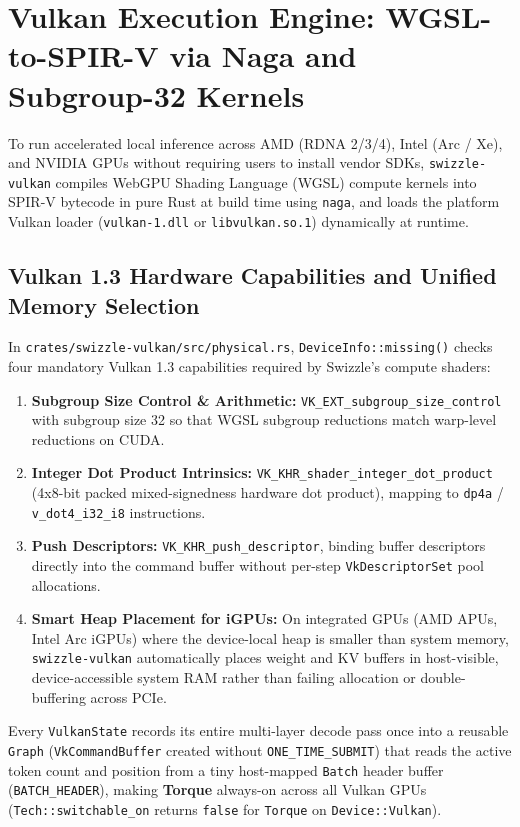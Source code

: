 \documentclass[10pt,a4paper]{article}
\theoremstyle{swzstyle}
\newcommand{\code}[1]{\texttt{#1}}
\begin{document}
\section{Vulkan Execution Engine: WGSL-to-SPIR-V via Naga and Subgroup-32 Kernels}

To run accelerated local inference across AMD (RDNA 2/3/4), Intel (Arc / Xe), and NVIDIA GPUs without requiring users to install vendor SDKs, \code{swizzle-vulkan} compiles WebGPU Shading Language (WGSL) compute kernels into SPIR-V bytecode in pure Rust at build time using \code{naga}, and loads the platform Vulkan loader (\code{vulkan-1.dll} or \code{libvulkan.so.1}) dynamically at runtime.

\subsection{Vulkan 1.3 Hardware Capabilities and Unified Memory Selection}

In \code{crates/swizzle-vulkan/src/physical.rs}, \code{DeviceInfo::missing()} checks four mandatory Vulkan 1.3 capabilities required by Swizzle's compute shaders:
\begin{enumerate}
  \item \textbf{Subgroup Size Control \& Arithmetic:} \code{VK\_EXT\_subgroup\_size\_control} with subgroup size 32 so that WGSL subgroup reductions match warp-level reductions on CUDA.
  \item \textbf{Integer Dot Product Intrinsics:} \code{VK\_KHR\_shader\_integer\_dot\_product} (4x8-bit packed mixed-signedness hardware dot product), mapping to \code{dp4a} / \code{v\_dot4\_i32\_i8} instructions.
  \item \textbf{Push Descriptors:} \code{VK\_KHR\_push\_descriptor}, binding buffer descriptors directly into the command buffer without per-step \code{VkDescriptorSet} pool allocations.
  \item \textbf{Smart Heap Placement for iGPUs:} On integrated GPUs (AMD APUs, Intel Arc iGPUs) where the device-local heap is smaller than system memory, \code{swizzle-vulkan} automatically places weight and KV buffers in host-visible, device-accessible system RAM rather than failing allocation or double-buffering across PCIe.
\end{enumerate}

Every \code{VulkanState} records its entire multi-layer decode pass once into a reusable \code{Graph} (\code{VkCommandBuffer} created without \code{ONE\_TIME\_SUBMIT}) that reads the active token count and position from a tiny host-mapped \code{Batch} header buffer (\code{BATCH\_HEADER}), making \textbf{Torque} always-on across all Vulkan GPUs (\code{Tech::switchable\_on} returns \code{false} for \code{Torque} on \code{Device::Vulkan}).
\end{document}
